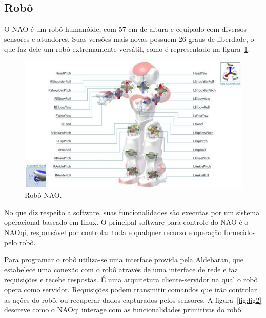 \documentclass[twoside,conference,a4paper]{IEEEtran}
\begin{document}
\subsection{Robô}
O NAO é um robô humanóide, com 57 cm de altura e equipado com diversos sensores e atuadores. Suas versões mais novas possuem 26 graus de liberdade, o que faz dele um robô extremamente versátil, como é representado na figura~\ref{fig:fig1}. 

\begin{figure}[ht]
\centering
\includegraphics[width=1\hsize]{figuras/nao1.jpg}
\caption{Robô NAO.}
\label{fig:fig1}
\end{figure}

No que diz respeito a software, suas funcionalidades são executas por um sistema operacional baseado em linux. O principal software para controle do NAO é o NAOqi, responsável por controlar toda e qualquer recurso e operação fornecidos pelo robô. 

Para programar o robô utiliza-se uma interface provida pela Aldebaran, que estabelece uma conexão com o robô através de uma interface de rede e faz requisições e recebe respostas. É uma arquitetura cliente-servidor na qual o robô opera como servidor. Requisições podem transmitir comandos que irão controlar as ações do robô, ou recuperar dados capturados pelos sensores. A figura~\ref{fig:fig2} descreve como o NAOqi interage com as funcionalidades primitivas do robô.
\end{document}
